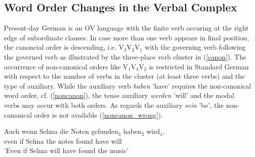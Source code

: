 \documentclass[output=paper]{langsci/langscibook}
\begin{document}
\subsection{Word Order Changes in the Verbal Complex \label{VC}} 

Present-day German is an OV language with the finite verb occuring at the right edge of subordinate clauses. In case more than one verb appears in final position, the canoncial order is descending, i.e. V$_3$V$_2$V$_1$ with the governing verb following the governed verb as illustrated by the three-place verb cluster in (\ref{canon}). The occurrence of non-canonical orders like V$_1$V$_3$V$_2$ is restricted in Standard German with respect to the number of verbs in the cluster (at least three verbs) and the type of auxiliary. While the auxiliary verb \textit{haben} 'have' requires the non-canonical word order, cf. (\ref{noncanon}), the tense auxiliary \textit{werden} 'will' and the modal verbs may occur with both orders. As regards the auxiliary \textit{sein} 'be', the non-canonical order is not available (\ref{noncanon_wrong}).  

\ea \label{canon}
\gll Auch wenn Selma die Noten gefunden$_3$ haben$_2$ wird$_1$, \\ even if Selma the notes found have will \\
\glt 'Even if Selma will have found the music'
\z
\end{document}
